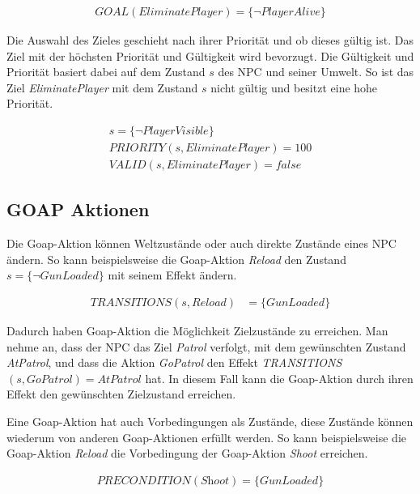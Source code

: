 \begin{align}
	\textit{GOAL}(\textit{EliminatePlayer}) = \{\lnot \textit{PlayerAlive}\}
\end{align}


Die Auswahl des Zieles geschieht nach ihrer Priorit\"{a}t und ob dieses g\"{u}ltig ist. Das Ziel mit der h\"{o}chsten Priorit\"{a}t und G\"{u}ltigkeit wird bevorzugt. Die G\"{u}ltigkeit und Priorit\"{a}t basiert dabei auf dem Zustand $s$ des NPC und seiner Umwelt. So ist das Ziel \textit{EliminatePlayer} mit dem Zustand $s$ nicht g\"{u}ltig und besitzt eine hohe Priorit\"{a}t.

\begin{align}
	s = \{\lnot \textit{PlayerVisible}\} \\
	\textit{PRIORITY}(s,\textit{EliminatePlayer}) = 100 \\
	\textit{VALID}(s,\textit{EliminatePlayer}) = \textit{false}
\end{align}


\subsection{GOAP Aktionen}
\label{chap:goap actions}

Die Goap-Aktion k\"{o}nnen Weltzust\"{a}nde oder auch direkte Zust\"{a}nde eines NPC \"{a}ndern. So kann beispielsweise die Goap-Aktion \textit{Reload} den Zustand $s = \{\lnot \textit{GunLoaded}\}$ mit seinem Effekt \"{a}ndern.

\begin{align}
	\textit{TRANSITIONS}(s,\textit{Reload}) &= \{\textit{GunLoaded}\}
\end{align}


Dadurch haben Goap-Aktion die M\"{o}glichkeit Zielzust\"{a}nde zu erreichen. Man nehme an, dass der NPC das Ziel \textit{Patrol} verfolgt, mit dem gew\"{u}nschten Zustand \textit{AtPatrol}, und dass die Aktion \textit{GoPatrol} den Effekt \textit{TRANSITIONS}$(s, \textit{GoPatrol}) = {\textit{AtPatrol}}$ hat. In diesem Fall kann die Goap-Aktion durch ihren Effekt den gew\"{u}nschten Zielzustand erreichen.

Eine Goap-Aktion hat auch Vorbedingungen als Zust\"{a}nde, diese Zust\"{a}nde k\"{o}nnen wiederum von anderen Goap-Aktionen erf\"{u}llt werden. So kann beispielsweise die Goap-Aktion \textit{Reload} die Vorbedingung der Goap-Aktion \textit{Shoot} erreichen.

\begin{align}
	\textit{PRECONDITION}(\textit{Shoot}) = \{\textit{GunLoaded}\}
\end{align}

